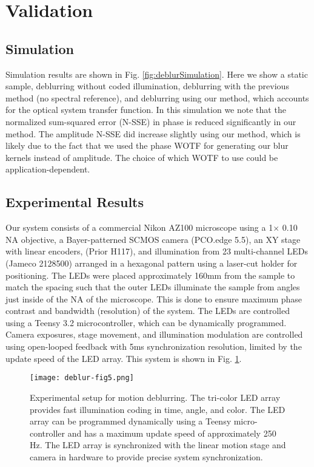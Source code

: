 \section{Validation}
\subsection{Simulation}
Simulation results are shown in Fig. \ref{fig:deblurSimulation}. Here we show a static sample, deblurring without coded illumination, deblurring with the previous method (no spectral reference), and deblurring using our method, which accounts for the optical system transfer function. In this simulation we note that the normalized sum-squared error (N-SSE) in phase is reduced significantly in our method. The amplitude N-SSE did increase slightly using our method, which is likely due to the fact that we used the phase WOTF for generating our blur kernels instead of amplitude. The choice of which WOTF to use could be application-dependent.

\subsection{Experimental Results}

Our system consists of a commercial Nikon AZ100 microscope using a 1$\times$ 0.10 NA objective, a Bayer-patterned SCMOS camera (PCO.edge 5.5), an XY stage with linear encoders, (Prior H117), and illumination from 23 multi-channel LEDs (Jameco 2128500) arranged in a hexagonal pattern using a laser-cut holder for positioning. The LEDs were placed approximately 160mm from the sample to match the spacing such that the outer LEDs illuminate the sample from angles just inside of the NA of the microscope. This is done to ensure maximum phase contrast and bandwidth (resolution) of the system. The LEDs are controlled using a Teensy 3.2 microcontroller, which can be dynamically programmed. Camera exposures, stage movement, and illumination modulation are controlled using open-looped feedback with 5ms synchronization resolution, limited by the update speed of the LED array. This system is shown in Fig. \ref{fig:deblurSystem}.

\begin{figure}[ph]
\centering
\texttt{[image: deblur-fig5.png]}
\caption{\label{fig:deblurSystem}
Experimental setup for motion deblurring. The tri-color LED array provides fast illumination coding in time, angle, and color. The LED array can be programmed dynamically using a Teensy micro-controller and has a maximum update speed of approximately 250 Hz. The LED array is synchronized with the linear motion stage and camera in hardware to provide precise system synchronization.}
\end{figure}


